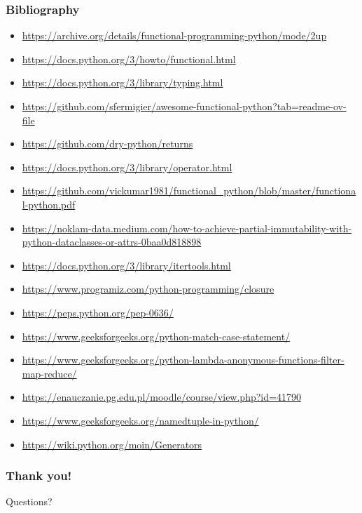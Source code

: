 \documentclass[envcountsect,10pt]{beamer}
\begin{document}
\begin{frame}[allowframebreaks]
    \frametitle{Bibliography}

    \begin{itemize}
        \item \url{https://archive.org/details/functional-programming-python/mode/2up}
        \item \url{https://docs.python.org/3/howto/functional.html}
        \item \url{https://docs.python.org/3/library/typing.html}
        \item \url{https://github.com/sfermigier/awesome-functional-python?tab=readme-ov-file}
        \item \url{https://github.com/dry-python/returns}
        \item \url{https://docs.python.org/3/library/operator.html}
        \item \url{https://github.com/vickumar1981/functional_python/blob/master/functional-python.pdf}
        \item \url{https://noklam-data.medium.com/how-to-achieve-partial-immutability-with-python-dataclasses-or-attrs-0baa0d818898}
        \item \url{https://docs.python.org/3/library/itertools.html}
        \item \url{https://www.programiz.com/python-programming/closure}
        \item \url{https://peps.python.org/pep-0636/}
        \item \url{https://www.geeksforgeeks.org/python-match-case-statement/}
        \item \url{https://www.geeksforgeeks.org/python-lambda-anonymous-functions-filter-map-reduce/}
        \item \url{https://enauczanie.pg.edu.pl/moodle/course/view.php?id=41790}
        \item \url{https://www.geeksforgeeks.org/namedtuple-in-python/}
        \item \url{https://wiki.python.org/moin/Generators}
    \end{itemize}
\end{frame}

\begin{frame}
    \frametitle{Thank you!}

    \begin{center}
        \Huge
        Questions?
    \end{center}
\end{frame}
\end{document}
